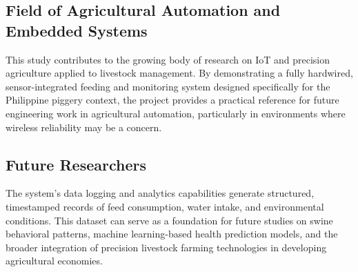 \subsection*{Field of Agricultural Automation and Embedded Systems}
This study contributes to the growing body of research on IoT and precision agriculture applied to livestock management. By demonstrating a fully hardwired, sensor-integrated feeding and monitoring system designed specifically for the Philippine piggery context, the project provides a practical reference for future engineering work in agricultural automation, particularly in environments where wireless reliability may be a concern.

\subsection*{Future Researchers}
The system's data logging and analytics capabilities generate structured, timestamped records of feed consumption, water intake, and environmental conditions. This dataset can serve as a foundation for future studies on swine behavioral patterns, machine learning-based health prediction models, and the broader integration of precision livestock farming technologies in developing agricultural economies.
